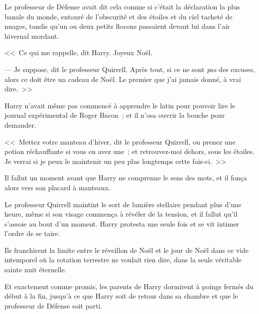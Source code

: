 Le professeur de Défense avait dit cela comme si c'était la déclaration la plus banale du monde, entouré de l'obscurité et des étoiles et du ciel tacheté de nuages, tandis qu'un ou deux petits flocons passaient devant lui dans l'air hivernal mordant.

<<~Ce qui me rappelle, dit Harry. Joyeux Noël.

--- Je suppose, dit le professeur Quirrell. Après tout, si ce ne sont \emph{pas} des excuses, alors ce doit être un cadeau de Noël. Le premier que j'ai jamais donné, à vrai dire.~>>

Harry n'avait même pas commencé à apprendre le latin pour pouvoir lire le journal expérimental de Roger Bacon~; et il n'osa ouvrir la bouche pour demander.

<<~Mettez votre manteau d'hiver, dit le professeur Quirrell, ou prenez une potion réchauffante si vous en avez une~; et retrouvez-moi dehors, sous les étoiles. Je verrai si je peux le maintenir un peu plus longtemps cette fois-ci.~>>

Il fallut un moment avant que Harry ne comprenne le sens des mots, et il fonça alors vers son placard à manteaux.

Le professeur Quirrell maintint le sort de lumière stellaire pendant plus d'une heure, même si son visage commença à révéler de la tension, et il fallut qu'il s'assoie au bout d'un moment. Harry protesta une seule fois et se vit intimer l'ordre de se taire.

Ils franchirent la limite entre le réveillon de Noël et le jour de Noël dans ce vide intemporel où la rotation terrestre ne voulait rien dire, dans la seule véritable sainte nuit éternelle.

Et exactement comme promis, les parents de Harry dormirent à poings fermés du début à la fin, jusqu'à ce que Harry soit de retour dans sa chambre et que le professeur de Défense soit parti.
